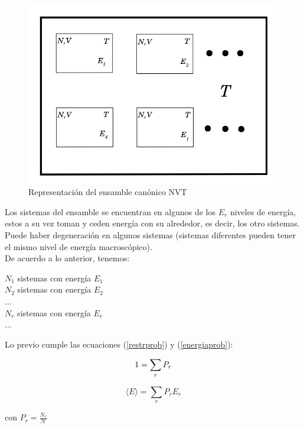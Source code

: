 \begin{figure}[!h]
    \centering
    \includegraphics[width=.55\textwidth,keepaspectratio=true]{EnsCanonico.png}
    \caption{Representación del ensamble canónico NVT \cite{belof2013alternative}}
    \label{fig:CanonicEns}
\end{figure}

\newpage

Los sistemas del ensamble se encuentran en algunos de los $E_r$ niveles de energía, estos a su vez toman y ceden energía con su alrededor, es decir, los otro sistemas. Puede haber degeneración en algunos sistemas (sistemas diferentes pueden tener el mismo nivel de energía macroscópico).\\

De acuerdo a lo anterior, tenemos:\\
\begin{center}
    $N_1$ sistemas con energía $E_1$\\
    $N_2$ sistemas con energía $E_2$\\
    ...\\
    $N_r$ sistemas con energía $E_r$\\
    ...\\
\end{center}


Lo previo cumple las ecuaciones (\ref{restrprob}) y (\ref{energiaprob}):

\begin{equation} \label{restrprob}
    1 = \sum_r P_r \\
\end{equation}

\begin{equation} \label{energiaprob}
    \langle E\rangle = \sum_r P_r E_r
\end{equation}

\begin{center}
    con $P_r = \frac{N_r}{\mathcal{N}}$
\end{center}


